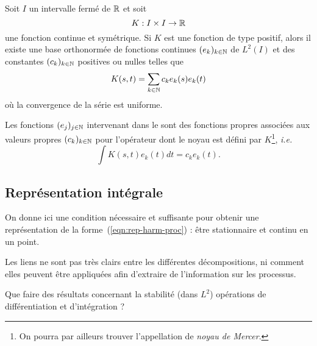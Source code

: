 \begin{theorem}
  \label{thm:mercers-theorem}
  Soit $I$ un intervalle fermé de $\mathbb{R}$ et soit
  \[ K : I\times I\to \mathbb{R} \] une fonction continue et symétrique. Si
  $K$ est une fonction de type positif, alors il existe une base
  orthonormée de fonctions continues $(e_k)_{k\in\mathbb{N}}$ de $L^2(I)$ et
  des constantes $(c_k)_{k\in\mathbb{N}}$ positives ou nulles telles que
  \begin{equation}
    K(s,t) = \sum_{k\in\mathbb{N}} c_k e_k(s) e_k(t)
  \end{equation}
  où la convergence de la série est uniforme.
\end{theorem}

\begin{remarque}
  Les fonctions $(e_j)_{j\in\mathbb{N}}$ intervenant dans le
   sont des \og fonctions propres\fg{}
  associées aux \og valeurs propres\fg{} $(c_k)_{k\in\mathbb{N}}$ pour
  l'opérateur dont le noyau est défini par $K$\footnote{On pourra par
    ailleurs trouver l'appellation de \emph{noyau de Mercer}.},
  \emph{i.e.}
  \begin{equation*}
    \int K(s,t) e_k(t) dt = c_k e_k(t).
  \end{equation*}
\end{remarque}


\subsection{Représentation intégrale}
On donne ici une condition nécessaire et suffisante pour obtenir une
représentation de la forme~(\ref{eqn:rep-harm-proc}) : être
stationnaire et continu en un point.

\begin{alert}
  Les liens ne sont pas très clairs entre les différentes
  décompositions, ni comment elles peuvent être appliquées afin
  d'extraire de l'information sur les processus.
\end{alert}

\begin{question}
  Que faire des résultats concernant la stabilité (dans $L^2$)
  opérations de différentiation et d'intégration ?
\end{question}
